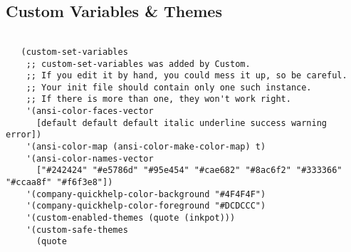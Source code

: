 \documentclass[11pt]{article}
\begin{document}
\subsection{Custom Variables \& Themes}
\label{sec:org2d0a0cc}
\begin{verbatim}

   (custom-set-variables
    ;; custom-set-variables was added by Custom.
    ;; If you edit it by hand, you could mess it up, so be careful.
    ;; Your init file should contain only one such instance.
    ;; If there is more than one, they won't work right.
    '(ansi-color-faces-vector
      [default default default italic underline success warning error])
    '(ansi-color-map (ansi-color-make-color-map) t)
    '(ansi-color-names-vector
      ["#242424" "#e5786d" "#95e454" "#cae682" "#8ac6f2" "#333366" "#ccaa8f" "#f6f3e8"])
    '(company-quickhelp-color-background "#4F4F4F")
    '(company-quickhelp-color-foreground "#DCDCCC")
    '(custom-enabled-themes (quote (inkpot)))
    '(custom-safe-themes
      (quote

\end{verbatim}
\end{document}
